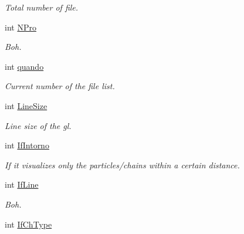 \begin{DoxyCompactItemize}
\begin{DoxyCompactList}\small\item\em \-Total number of file. \end{DoxyCompactList}\item 
\hypertarget{classElPoly_a1ec5265fae2a3e11f0ee82db6a536ec5}{int \hyperlink{classElPoly_a1ec5265fae2a3e11f0ee82db6a536ec5}{\-N\-Pro}}\label{classElPoly_a1ec5265fae2a3e11f0ee82db6a536ec5}

\begin{DoxyCompactList}\small\item\em \-Boh. \end{DoxyCompactList}\item 
\hypertarget{classElPoly_af67f045188086b91309e231e77a86076}{int \hyperlink{classElPoly_af67f045188086b91309e231e77a86076}{quando}}\label{classElPoly_af67f045188086b91309e231e77a86076}

\begin{DoxyCompactList}\small\item\em \-Current number of the file list. \end{DoxyCompactList}\item 
\hypertarget{classElPoly_a676418848d4d134fdefd0bda050ddea1}{int \hyperlink{classElPoly_a676418848d4d134fdefd0bda050ddea1}{\-Line\-Size}}\label{classElPoly_a676418848d4d134fdefd0bda050ddea1}

\begin{DoxyCompactList}\small\item\em \-Line size of the gl. \end{DoxyCompactList}\item 
\hypertarget{classElPoly_aa08916cc778623ef039a8c2062b0e545}{int \hyperlink{classElPoly_aa08916cc778623ef039a8c2062b0e545}{\-If\-Intorno}}\label{classElPoly_aa08916cc778623ef039a8c2062b0e545}

\begin{DoxyCompactList}\small\item\em \-If it visualizes only the particles/chains within a certain distance. \end{DoxyCompactList}\item 
int \hyperlink{classElPoly_ac3e70209b515c8a6293fcdb019a2fb29}{\-If\-Line}
\begin{DoxyCompactList}\small\item\em \-Boh. \end{DoxyCompactList}\item 
\hypertarget{classElPoly_ac79c99da0d26e5f99e97572f425482ec}{int \hyperlink{classElPoly_ac79c99da0d26e5f99e97572f425482ec}{\-If\-Ch\-Type}}\label{classElPoly_ac79c99da0d26e5f99e97572f425482ec}


\end{DoxyCompactItemize}
